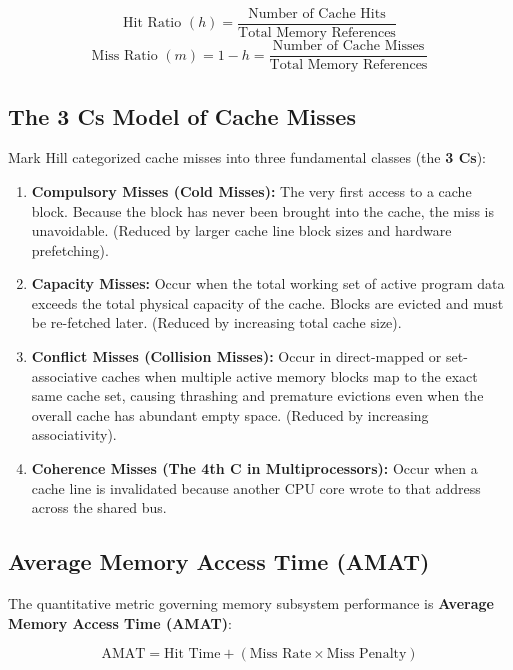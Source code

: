 \begin{equation}
\label{eq:hit_ratio}
\text{Hit Ratio } (h) = \frac{\text{Number of Cache Hits}}{\text{Total Memory References}}
\end{equation}
\begin{equation}
\label{eq:miss_ratio}
\text{Miss Ratio } (m) = 1 - h = \frac{\text{Number of Cache Misses}}{\text{Total Memory References}}
\end{equation}

\subsection{The 3 Cs Model of Cache Misses}
Mark Hill categorized cache misses into three fundamental classes (the \textbf{3 Cs}):
\begin{enumerate}[label=\bfseries\arabic*.]
    \item \textbf{Compulsory Misses (Cold Misses):} The very first access to a cache block. Because the block has never been brought into the cache, the miss is unavoidable. (Reduced by larger cache line block sizes and hardware prefetching).
    \item \textbf{Capacity Misses:} Occur when the total working set of active program data exceeds the total physical capacity of the cache. Blocks are evicted and must be re-fetched later. (Reduced by increasing total cache size).
    \item \textbf{Conflict Misses (Collision Misses):} Occur in direct-mapped or set-associative caches when multiple active memory blocks map to the exact same cache set, causing thrashing and premature evictions even when the overall cache has abundant empty space. (Reduced by increasing associativity).
    \item \textbf{Coherence Misses (The 4th C in Multiprocessors):} Occur when a cache line is invalidated because another CPU core wrote to that address across the shared bus.
\end{enumerate}

\subsection{Average Memory Access Time (AMAT)}
The quantitative metric governing memory subsystem performance is \textbf{Average Memory Access Time (AMAT)}:

\begin{equation}
\label{eq:amat_single}
\boxed{\text{AMAT} = \text{Hit Time} + (\text{Miss Rate} \times \text{Miss Penalty})}
\end{equation}

